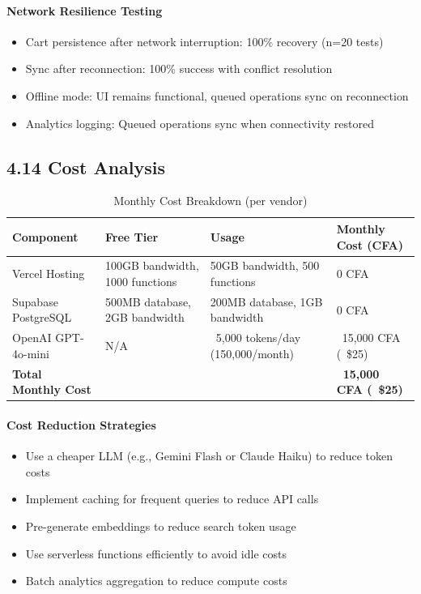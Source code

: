 \documentclass[12pt,a4paper]{article}
\begin{document}
\paragraph{Network Resilience Testing}

\begin{itemize}
    \item Cart persistence after network interruption: 100\% recovery (n=20 tests)
    \item Sync after reconnection: 100\% success with conflict resolution
    \item Offline mode: UI remains functional, queued operations sync on reconnection
    \item Analytics logging: Queued operations sync when connectivity restored
\end{itemize}

\subsection{4.14 Cost Analysis}

\begin{table}[h]
\centering
\caption{Monthly Cost Breakdown (per vendor)}
\label{tab:cost}
\begin{tabular}{p{4cm}p{4cm}p{4cm}p{3cm}}
\toprule
\textbf{Component} & \textbf{Free Tier} & \textbf{Usage} & \textbf{Monthly Cost (CFA)} \\
\midrule
Vercel Hosting & 100GB bandwidth, 1000 functions & 50GB bandwidth, 500 functions & 0 CFA \\
Supabase PostgreSQL & 500MB database, 2GB bandwidth & 200MB database, 1GB bandwidth & 0 CFA \\
OpenAI GPT-4o-mini & N/A & ~5,000 tokens/day (150,000/month) & ~15,000 CFA (~\$25) \\
\hline
\textbf{Total Monthly Cost} & & & \textbf{~15,000 CFA (~\$25)} \\
\bottomrule
\end{tabular}
\end{table}

\paragraph{Cost Reduction Strategies}

\begin{itemize}
    \item Use a cheaper LLM (e.g., Gemini Flash or Claude Haiku) to reduce token costs
    \item Implement caching for frequent queries to reduce API calls
    \item Pre-generate embeddings to reduce search token usage
    \item Use serverless functions efficiently to avoid idle costs
    \item Batch analytics aggregation to reduce compute costs
\end{itemize}
\end{document}
